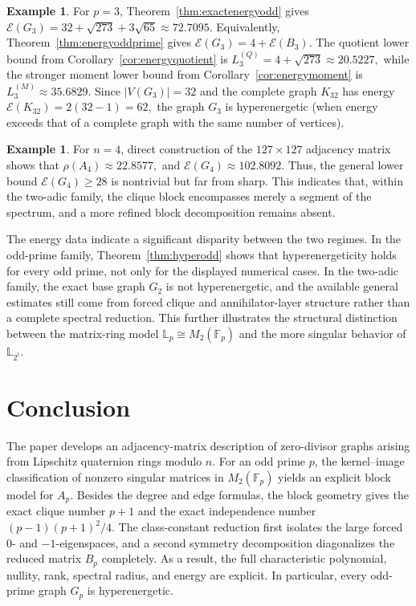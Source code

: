 \documentclass[12pt]{article}
\theoremstyle{definition}
\newtheorem{example}[theorem]{Example}
\newcommand{\F}{\mathbb{F}}
\newcommand{\LL}{\mathbb{L}}
\begin{document}
	\begin{example}\label{ex:energyp3}
		For $p=3$, Theorem~\ref{thm:exactenergyodd} gives $\mathcal E(G_3)=32+\sqrt{273}+3\sqrt{65}\approx72.7095.$ Equivalently, Theorem~\ref{thm:energyoddprime} gives $\mathcal E(G_3)=4+\mathcal E(B_3)$. The quotient lower bound from Corollary~\ref{cor:energyquotient} is $L_3^{(Q)}=4+\sqrt{273}\approx 20.5227,$ 	while the stronger moment lower bound from
		Corollary~\ref{cor:energymoment} is $L_3^{(M)}\approx 35.6829.$ Since $|V(G_3)|=32$ and the complete graph $K_{32}$ has energy $\mathcal E(K_{32})=2(32-1)=62,$ the graph $G_3$ is hyperenergetic (when energy exceeds that of a complete graph with the same number of vertices).
	\end{example}
	\begin{example}\label{ex:energy4}
		For $n=4$, direct construction of the $127\times 127$ adjacency matrix
		shows that $\rho(A_4)\approx 22.8577,$ and $\mathcal E(G_4)\approx 102.8092.$  Thus, the general lower bound
		$\mathcal E(G_4)\ge 28$ is nontrivial but far from sharp. This indicates that, within the two-adic family, the clique block encompasses merely a segment of the spectrum, and a more refined block decomposition remains absent.
	\end{example}
	
	The energy data indicate a significant disparity between the two regimes. In the odd-prime family, Theorem~\ref{thm:hyperodd} shows that hyperenergeticity holds for every odd prime, not only for the displayed numerical cases. In the two-adic family, the exact base graph $G_2$ is not hyperenergetic, and the available general estimates still come from forced clique and annihilator-layer structure rather than a complete spectral reduction. This further illustrates the structural distinction between the matrix-ring model $\LL_p\cong M_2(\F_p)$ and the more singular behavior of $\LL_{2^t}$.
	
	
	
	\section{Conclusion}\label{con}
	The paper develops an adjacency-matrix description of zero-divisor graphs arising from Lipschitz quaternion rings modulo $n$. For an odd prime $p$, the kernel--image classification of nonzero singular matrices in $M_2(\F_p)$ yields an explicit block model for $A_p$. Besides the degree and edge formulas, the block geometry gives the exact clique number $p+1$ and the exact independence number $(p-1)(p+1)^2/4$. The class-constant reduction first isolates the large forced $0$- and $-1$-eigenspaces, and a second symmetry decomposition diagonalizes the reduced matrix $B_p$ completely. As a result, the full characteristic polynomial, nullity, rank, spectral radius, and energy are explicit. In particular, every odd-prime graph $G_p$ is hyperenergetic.
	
\end{document}

